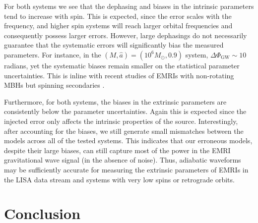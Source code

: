 \documentclass[%
 reprint,
 nofootinbib,
 amsmath,amssymb,
 aps,
 prd,
]{revtex4-2}
\begin{document}
For both systems we see that the dephasing and biases in the intrinsic parameters tend to increase with spin. This is expected, since the error scales with the frequency, and higher spin systems will reach larger orbital frequencies and consequently possess larger errors. However, large dephasings do not necessarily guarantee that the systematic errors will significantly bias the measured parameters. For instance, in the $(M, \hat{a})=(10^6 M_\odot, 0.9)$ system, $\Delta \Phi_\mathrm{GW} \sim 10$ radians, yet the systematic biases remain smaller on the statistical parameter uncertainties. This is inline with recent studies of EMRIs with non-rotating MBHs but spinning secondaries \cite{Burke}. 

Furthermore, for both systems, the biases in the extrinsic parameters are consistently below the parameter uncertainties. Again this is expected since the injected error only affects the intrinsic properties of the source. Interestingly, after accounting for the biases, we still generate small mismatches between the models across all of the tested systems. This indicates that our erroneous models, despite their large biases, can still capture most of the power in the EMRI gravitational wave signal (in the absence of noise). Thus, adiabatic waveforms may be sufficiently accurate for measuring the extrinsic parameters of EMRIs in the LISA data stream and systems with very low spins or retrograde orbits.  

\section{Conclusion}
\label{sec:conclusion}
\end{document}
